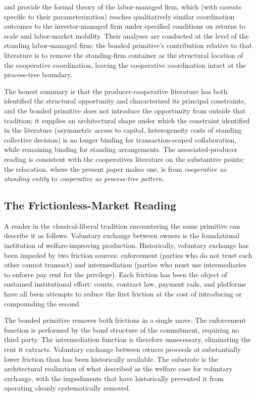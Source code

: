 \documentclass[11pt,a4paper]{article}
\theoremstyle{remark}
\begin{document}
\citet{vanek1970general} and \citet{ward1958firm} provide the
formal theory of the labor-managed firm, which (with caveats
specific to their parameterization) reaches qualitatively
similar coordination outcomes to the investor-managed firm under
specified conditions on returns to scale and labor-market
mobility. Their analyses are conducted at the level of the
standing labor-managed firm; the bonded primitive's contribution
relative to that literature is to remove the standing-firm
container as the structural location of the cooperative
coordination, leaving the cooperative coordination intact at the
process-tree boundary.

The honest summary is that the producer-cooperative literature
has both identified the structural opportunity and characterized
its principal constraints, and the bonded primitive does not
introduce the opportunity from outside that tradition; it
supplies an architectural shape under which the constraint
identified in the literature (asymmetric access to capital,
heterogeneity costs of standing collective decision) is no longer
binding for transaction-scoped collaboration, while remaining
binding for standing arrangements. The associated-producer
reading is consistent with the cooperatives literature on the
substantive points; the relocation, where the present paper
makes one, is from \emph{cooperative as standing entity} to
\emph{cooperative as process-tree pattern}.

\subsection{The Frictionless-Market Reading}
\label{sec:frictionless-market}

A reader in the classical-liberal tradition encountering the
same primitive can describe it as follows. Voluntary exchange
between owners is the foundational institution of welfare-improving
production. Historically, voluntary exchange has been impeded by
two friction sources: enforcement (parties who do not trust each
other cannot transact) and intermediation (parties who must use
intermediaries to enforce pay rent for the privilege). Each
friction has been the object of sustained institutional effort:
courts, contract law, payment rails, and platforms have all been
attempts to reduce the first friction at the cost of introducing
or compounding the second.

The bonded primitive removes both frictions in a single move. The
enforcement function is performed by the bond structure of the
commitment, requiring no third party. The intermediation function
is therefore unnecessary, eliminating the rent it extracts.
Voluntary exchange between owners proceeds at substantially lower
friction than has been historically available. The substrate is
the architectural realization of what
\citet{hayek1945knowledge,friedman1962capitalism} described as
the welfare case for voluntary exchange, with the impediments
that have historically prevented it from operating cleanly
systematically removed.
\end{document}
